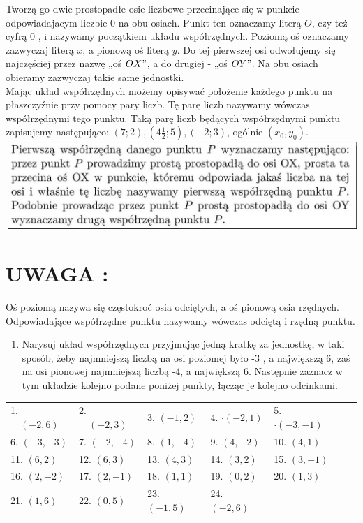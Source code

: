 \documentclass[10pt]{article}
\begin{document}
Tworzą go dwie prostopadłe osie liczbowe przecinające się w punkcie odpowiadajacym liczbie 0 na obu osiach. Punkt ten oznaczamy literą \(O\), czy też cyfrą 0 , i nazywamy początkiem układu współrzędnych. Poziomą oś oznaczamy zazwyczaj literą \(x\), a pionową oś literą \(y\). Do tej pierwszej osi odwołujemy się najczęściej przez nazwę „oś \(O X "\), a do drugiej - „oś \(O Y "\). Na obu osiach obieramy zazwyczaj takie same jednostki.\\
Mając układ współrzędnych możemy opisywać położenie każdego punktu na płaszczyźnie przy pomocy pary liczb. Tę parę liczb nazywamy wówczas współrzędnymi tego punktu. Taką parę liczb będących współrzędnymi punktu zapisujemy następująco: \((7 ; 2),\left(4 \frac{1}{2} ; 5\right),(-2 ; 3)\), ogólnie \(\left(x_{0}, y_{0}\right)\).\\
\includegraphics[max width=\textwidth, center]{2024_11_21_8f01584889ff06348ae7g-065(1)}

\section*{UWAGA :}
Oś poziomą nazywa się częstokroć osia odciętych, a oś pionową osia rzędnych. Odpowiadające współrzędne punktu nazywamy wówczas odciętą i rzędną punktu.

\begin{enumerate}
  \item Narysuj układ współrzędnych przyjmując jedną kratkę za jednostkę, w taki sposób, żeby najmniejszą liczbą na osi poziomej było -3 , a największą 6, zaś na osi pionowej najmniejszą liczbą -4, a największą 6. Następnie zaznacz w tym układzie kolejno podane poniżej punkty, łącząc je kolejno odcinkami.
\end{enumerate}

\begin{center}
\begin{tabular}{lllllll}
1. \(\quad(-2,6)\) & 2. \(\quad(-2,3)\) & 3. \((-1,2)\) & 4. \(\cdot(-2,1)\) & 5. \(\cdot(-3,-1)\) \\
6. \((-3,-3)\) & 7. \((-2,-4)\) & 8. \((1,-4)\) & 9. \((4,-2)\) & 10. \((4,1)\) \\
11. \((6,2)\) & 12. \((6,3)\) & 13. \((4,3)\) & 14. \((3,2)\) & 15. \((3,-1)\) \\
16. \((2,-2)\) & 17. \((2,-1)\) & 18. \((1,1)\) & 19. \((0,2)\) & 20. \((1,3)\) \\
21. \((1,6)\) & 22. \((0,5)\) & 23. \((-1,5)\) & 24. \((-2,6)\) &  \\
\end{tabular}
\end{center}
\end{document}

